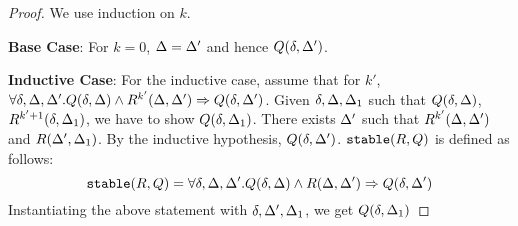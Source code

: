 \documentclass[acmlarge,anonymous]{acmart}\settopmatter{printfolios=true}
\begin{document}
\begin{proof}
We use induction on $k$. 

\textbf{Base Case}: For $k = 0$, $\Delta = \Delta'$ and hence $Q(\delta, \Delta')$. 

\textbf{Inductive Case}: For the inductive case, assume that for $k'$, $\forall \delta, \Delta, \Delta'. Q(\delta, \Delta) \wedge R^{k'}(\Delta, \Delta') \Rightarrow Q(\delta, \Delta')$.
Given $\delta, \Delta, \Delta_1$ such that $Q(\delta, \Delta)$, $R^{k'+1}(\delta, \Delta_1)$, we have to show $Q(\delta, \Delta_1)$. There exists $\Delta'$ such that $R^{k'}(\Delta, \Delta')$ and $R(\Delta', \Delta_1)$. By the inductive hypothesis, $Q(\delta, \Delta')$. $\mathtt{stable}(R,Q)$ is defined as follows:
$$
\mathtt{stable}(R,Q) = \forall \delta, \Delta, \Delta'. Q(\delta, \Delta) \wedge R(\Delta, \Delta') \Rightarrow Q(\delta, \Delta')
$$
Instantiating the above statement with $\delta, \Delta', \Delta_1$, we get $Q(\delta, \Delta_1)$
\end{proof}
\end{document}
